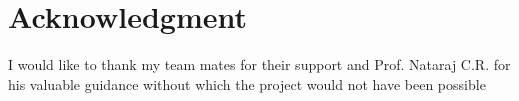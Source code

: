 \documentclass[journal]{IEEEtran}
\begin{document}
\section*{Acknowledgment}

I would like to thank my team mates for their support and Prof. Nataraj C.R. for his valuable guidance without which the project would not have been possible
\ifCLASSOPTIONcaptionsoff
  \newpage
\fi




\end{document}
